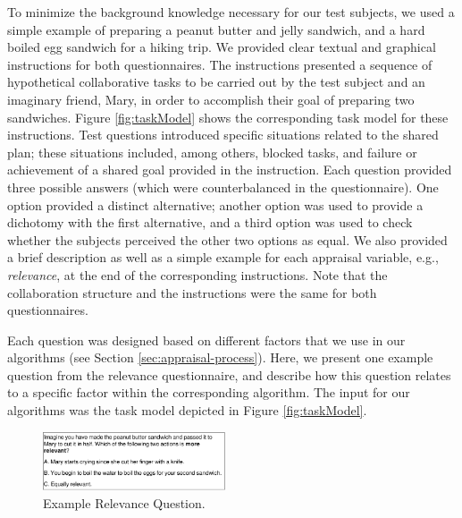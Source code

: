 \documentclass{article}
\begin{document}
To minimize the background knowledge necessary for our test subjects, we used a
simple example of preparing a peanut butter and jelly sandwich, and a hard
boiled egg sandwich for a hiking trip. We provided clear textual and graphical
instructions for both questionnaires. The instructions presented a sequence of
hypothetical collaborative tasks to be carried out by the test subject and an
imaginary friend, Mary, in order to accomplish their goal of preparing two
sandwiches. Figure \ref{fig:taskModel} shows the corresponding task model for
these instructions. Test questions introduced specific situations related to the
shared plan; these situations included, among others, blocked tasks, and failure
or achievement of a shared goal provided in the instruction. Each question
provided three possible answers (which were counterbalanced in the
questionnaire). One option provided a distinct alternative; another option was
used to provide a dichotomy with the first alternative, and a third option was
used to check whether the subjects perceived the other two options as equal.
We also provided a brief description as well as a simple example for each
appraisal variable, e.g., \textit{relevance}, at the end of the corresponding
instructions. Note that the collaboration structure and the instructions were
the same for both questionnaires.

Each question was designed based on different factors that we use in our
algorithms (see Section \ref{sec:appraisal-process}). Here, we present one
example question from the relevance questionnaire, and describe how this
question relates to a specific factor within the corresponding algorithm. The
input for our algorithms was the task model depicted in Figure
\ref{fig:taskModel}.

\begin{figure}[tbh]
  \vspace{-1mm}
  \centering
  \includegraphics[width=0.48\textwidth]{figure/question-sample4-croped.pdf}
  \vspace*{-7mm}
  \caption{{\fontsize{9}{9}\selectfont Example Relevance Question.}}
  \label{fig:qs1}
  \vspace{-4mm}
\end{figure}
\end{document}
